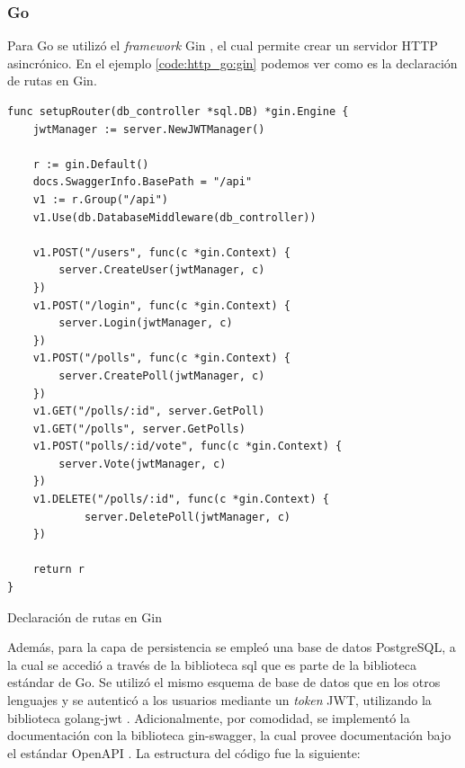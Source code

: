 \documentclass[11pt]{article}
\let\Oldsubsubsection\subsubsection
\renewcommand{\subsubsection}{\FloatBarrier\Oldsubsubsection}
\newcommand{\english}[1]{\textit{#1}}
\begin{document}
\subsubsection{Go}

Para Go se utilizó el \english{framework} Gin \cite{http:go:gin}, el cual permite crear un servidor HTTP asincrónico. En el ejemplo \ref{code:http_go:gin} podemos ver como es la declaración de rutas en Gin.

\begin{listing}
\begin{verbatim}
func setupRouter(db_controller *sql.DB) *gin.Engine {
	jwtManager := server.NewJWTManager()

	r := gin.Default()
	docs.SwaggerInfo.BasePath = "/api"
	v1 := r.Group("/api")
	v1.Use(db.DatabaseMiddleware(db_controller))
	
	v1.POST("/users", func(c *gin.Context) {
		server.CreateUser(jwtManager, c)
	})
	v1.POST("/login", func(c *gin.Context) {
		server.Login(jwtManager, c)
	})
	v1.POST("/polls", func(c *gin.Context) {
		server.CreatePoll(jwtManager, c)
	})
	v1.GET("/polls/:id", server.GetPoll)
	v1.GET("/polls", server.GetPolls)
	v1.POST("polls/:id/vote", func(c *gin.Context) {
		server.Vote(jwtManager, c)
	})
	v1.DELETE("/polls/:id", func(c *gin.Context) {
            server.DeletePoll(jwtManager, c)
	})

	return r
}
\end{verbatim}
\caption{Declaración de rutas en Gin}
\label{code:http_go:gin}
\end{listing}

Además, para la capa de persistencia se empleó una base de datos PostgreSQL, a la cual se accedió a través de la biblioteca sql \cite{http:go:sql} que es parte de la biblioteca estándar de Go. Se utilizó el mismo esquema de base de datos que en los otros lenguajes y se autenticó a los usuarios mediante un \english{token} JWT, utilizando la biblioteca golang-jwt \cite{http:go:jwt}. Adicionalmente, por comodidad, se implementó la documentación con la biblioteca gin-swagger, la cual provee documentación bajo el estándar OpenAPI \cite{http:ex:openapi}. La estructura del código fue la siguiente:
\end{document}
